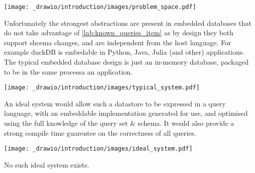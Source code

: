 \begin{center}
    \texttt{[image: \_drawio/introduction/images/problem\_space.pdf]}
\end{center}
Unfortunately the strongest abstractions are present in embedded databases that do not take advantage of \ref{lab:known_queries_item} as by design
they both support shcema changes, and are independent from the host language. For example duckDB is embedable in Python, Java, Julia (and other)
applications. The typical embedded database design is just an in-memory database, packaged to be in the same processa an application.
\begin{center}
    \texttt{[image: \_drawio/introduction/images/typical\_system.pdf]}
\end{center}
\noindent An ideal system would allow such a datastore to be expressed in a query language, with an embeddable
implementation generated for use, and optimised using the full knowledge of the query set \& schema. It would also provide a strong compile time guarentee on the correctness of all queries.
\begin{center}
    \texttt{[image: \_drawio/introduction/images/ideal\_system.pdf]}
\end{center}
\noindent
No such ideal system exists.
